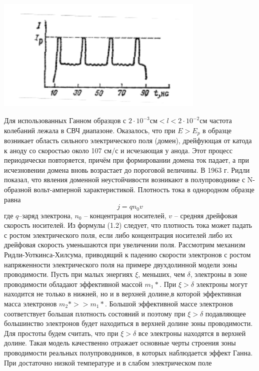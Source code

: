 \documentclass[a4paper, 12pt]{article}
\begin{document}
\begin{center}
    \includegraphics[width=100mm]{./pictures/graph.png}
\end{center}

Для использованных Ганном образцов с $2\cdot 10^{-3}\text{см} < l < 2\cdot 10^{-2}\text{см}$ частота колебаний
лежала в СВЧ диапазоне. Оказалось, что при $E > E_p$ в образце возникает область
сильного электрического поля (домен), дрейфующая от катода к аноду со
скоростью около 107 см/с и исчезающая у анода. Этот процесс периодически
повторяется, причём при формировании домена ток падает, а при исчезновении
домена вновь возрастает до пороговой величины. В 1963 г. Ридли показал, что
явления доменной неустойчивости возникают в полупроводнике с N-образной
вольт-амперной характеристикой. Плотность тока в однородном образце равна
\[j = qn_0 v\]
где $q$–заряд электрона, $n_0$ – концентрация носителей, $v$ – средняя дрейфовая
скорость носителей. Из формулы (1.2) следует, что плотность тока может падать с
ростом электрического поля, если либо концентрация носителей либо их
дрейфовая скорость уменьшаются при увеличении поля.
Рассмотрим механизм Ридли-Уоткинса-Хилсума, приводящий к
падению скорости электронов с ростом напряженности электрического поля на
примере двухдолинной модели зоны проводимости. Пусть при малых энергиях $\xi$,
меньших, чем $\delta$, электроны в зоне проводимости обладают эффективной массой
$m_1*$. При $\xi > \delta$ электроны могут находится не только в нижней, но и в верхней
долине,в которой эффективная масса электронов $m_2*>>m_1*$. Большой эффективной
массе электронов соответствует большая плотность состояний и поэтому при $\xi > \delta$
подавляющее большинство электронов будет находиться в верхней долине зоны
проводимости. Для простоты будем считать, что при $\xi > \delta$ все электроны находятся
в верхней долине. Такая модель качественно отражает основные черты строения
зоны проводимости реальных полупроводников, в которых наблюдается эффект
Ганна. При достаточно низкой температуре и в слабом электрическом поле
\end{document}
